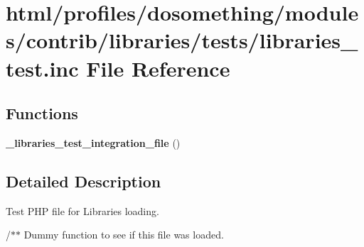 \hypertarget{libraries__test_8inc}{
\section{html/profiles/dosomething/modules/contrib/libraries/tests/libraries\_\-test.inc File Reference}
\label{libraries__test_8inc}
}
\subsection*{Functions}
\begin{DoxyCompactItemize}
\item 
\hypertarget{libraries__test_8inc_a69b0038603d854b5f61c5b6d61ebbe84}{
{\bfseries \_\-libraries\_\-test\_\-integration\_\-file} ()}
\label{libraries__test_8inc_a69b0038603d854b5f61c5b6d61ebbe84}

\end{DoxyCompactItemize}


\subsection{Detailed Description}
Test PHP file for Libraries loading.

/$\ast$$\ast$ Dummy function to see if this file was loaded. 